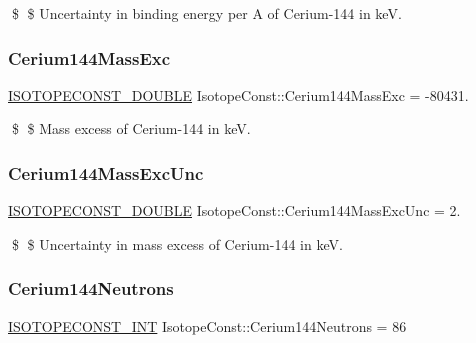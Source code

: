 \$ \$ Uncertainty in binding energy per A of Cerium-\/144 in keV. \mbox{\label{group___isotope_const-_cerium-_ce144_ga466ea832ccd46d3e3b215d102646067f}} 
\subsubsection{\texorpdfstring{Cerium144\+Mass\+Exc}{Cerium144MassExc}}
{\footnotesize\ttfamily \mbox{\hyperlink{group___isotope_const-_macros_ga8f45a7272ce02c0b4c65c44636ed719a}{I\+S\+O\+T\+O\+P\+E\+C\+O\+N\+S\+T\+\_\+\+D\+O\+U\+B\+LE}} Isotope\+Const\+::\+Cerium144\+Mass\+Exc = -\/80431.}

\$ \$ Mass excess of Cerium-\/144 in keV. \mbox{\label{group___isotope_const-_cerium-_ce144_gaf56249cc92a41af14664e1ee1d7fdcff}} 
\subsubsection{\texorpdfstring{Cerium144\+Mass\+Exc\+Unc}{Cerium144MassExcUnc}}
{\footnotesize\ttfamily \mbox{\hyperlink{group___isotope_const-_macros_ga8f45a7272ce02c0b4c65c44636ed719a}{I\+S\+O\+T\+O\+P\+E\+C\+O\+N\+S\+T\+\_\+\+D\+O\+U\+B\+LE}} Isotope\+Const\+::\+Cerium144\+Mass\+Exc\+Unc = 2.}

\$ \$ Uncertainty in mass excess of Cerium-\/144 in keV. \mbox{\label{group___isotope_const-_cerium-_ce144_ga39587347aeadc54212b3129c64278e13}} 
\subsubsection{\texorpdfstring{Cerium144\+Neutrons}{Cerium144Neutrons}}
{\footnotesize\ttfamily \mbox{\hyperlink{group___isotope_const-_macros_ga5f18360b3e99483a35c32d789e62621c}{I\+S\+O\+T\+O\+P\+E\+C\+O\+N\+S\+T\+\_\+\+I\+NT}} Isotope\+Const\+::\+Cerium144\+Neutrons = 86}

